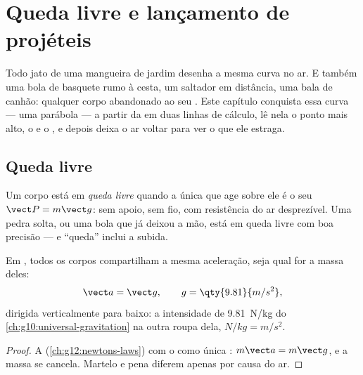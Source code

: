 \chapter{Queda livre e lançamento de projéteis}\label{ch:g12:projectile-motion}

Todo jato de uma mangueira de jardim desenha a mesma curva no ar. E também uma bola de
basquete rumo à cesta, um saltador em distância, uma bala de canhão: qualquer corpo
abandonado ao seu . Este capítulo conquista essa curva --- uma parábola --- a
partir da  em duas linhas de cálculo, lê nela o ponto mais alto,
o  e o , e depois deixa o ar voltar para ver o que ele estraga.

\section{Queda livre}

\begin{definition}\label{def:g12:projectile-motion:freefall}
Um corpo está em \emph{queda livre} quando a única  que age
sobre ele é o seu  $\vect P = m\vect g$: sem apoio, sem fio, com resistência do ar
desprezível. Uma pedra solta, ou uma bola que já deixou a mão, está em queda livre com
boa precisão --- e ``queda'' inclui a subida.
\end{definition}

\begin{theorem}\label{thm:g12:projectile-motion:galileo}
Em , todos os corpos compartilham a mesma aceleração, seja qual for a massa
deles:
\[
\vect a = \vect g, \qquad g = \qty{9.81}{m/s^2},
\]
dirigida verticalmente para baixo: a intensidade de  \qty{9.81}{N/kg} do
\cref{ch:g10:universal-gravitation} na outra roupa dela,
$\unit{N/kg} = \unit{m/s^2}$.
\end{theorem}

\begin{proof}
A  (\cref{ch:g12:newtons-laws}) com o  como única :
$m\vect a = m\vect g$, e a massa se cancela. Martelo e pena diferem apenas por causa
do ar.
\end{proof}

